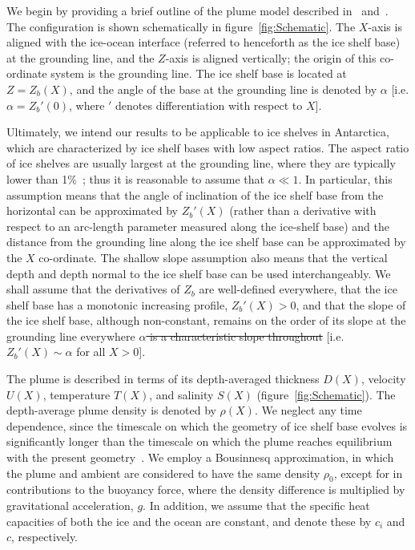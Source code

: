 \documentclass[openacc]{rsproca_new}%
\newcommand{\red}[1]{{\color{red} #1}}
\newcommand{\blue}[1]{{\color{blue} #1}}
\newcommand{\rout}[1]{\red{\st{#1}}}\newcommand{\ab}[1]{\textcolor{Green}{#1}}\newcommand{\about}[1]{\textcolor{Cyan}{\sout{#1}}}
\begin{document}
We begin by providing a brief outline of the plume model described in~\cite{Jenkins1991JGeophysResOceans} and~\cite{Jenkins2011JPhysOcean}. The configuration is shown schematically in figure~\ref{fig:Schematic}. The $X$-axis is aligned with the ice-ocean interface (referred to henceforth as the ice shelf base) at the grounding line, and the $Z$-axis is aligned vertically; the origin of this co-ordinate system is the grounding line. The ice shelf base is located at $Z = Z_b(X)$, and the angle of the base at the grounding line is denoted by $\alpha$ [i.e. $\alpha = Z_b'(0)$, where $'$ denotes differentiation with respect to $X$].

Ultimately, we intend our results to  be applicable to ice shelves in Antarctica, which are characterized by ice shelf bases with low aspect ratios. \blue{The aspect ratio of ice shelves are usually largest at the grounding line, where they are typically lower than 1\%~\cite{Rignot2011GRL}; thus it is reasonable to assume that} $\alpha \ll 1$. In particular, this assumption means that the angle of inclination of the ice shelf base from the horizontal can be approximated by $Z_b'(X)$ (rather than a derivative with respect to an arc-length parameter measured along the ice-shelf base) and the distance from the grounding line along the ice shelf base can be approximated by the $X$ co-ordinate. The shallow slope assumption also means that the vertical depth and depth normal to the ice shelf base can be used interchangeably. We shall assume that the derivatives of $Z_b$ are well-defined everywhere, that the ice shelf base has a monotonic increasing profile, $Z_b'(X) >0$, and that \blue{the slope of the ice shelf base, although non-constant, remains on the order of its slope at the grounding line everywhere} \rout{$\alpha$ is a characteristic slope throughout} [i.e. $Z_b'(X)\sim \alpha$ for all $X >0$]. 

The plume is described in terms of its depth-averaged thickness $D(X)$, velocity $U(X)$, temperature $T(X)$, and salinity $S(X)$ (figure~\ref{fig:Schematic}). The depth-average plume density is denoted by $\rho(X)$. We neglect any time dependence, since the timescale on which the geometry of ice shelf base evolves is significantly longer than the timescale on which the plume reaches equilibrium with the present geometry~\cite{Hewitt2020AnnRevFlu}. \blue{We employ a Bousinnesq approximation, in which the plume and ambient are considered to have the same density $\rho_0$, except for in contributions to the buoyancy force, where the density difference is multiplied by gravitational acceleration, $g$. In addition, we assume that the specific heat capacities of both the ice and the ocean are constant, and denote these by $c_i$ and $c$, respectively.}
\end{document}

